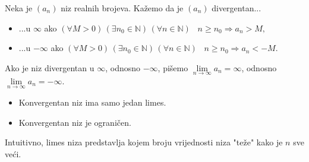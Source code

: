 \begin{definition}
Neka je \((a_n)\) niz realnih brojeva. Kažemo da je \((a_n)\) divergentan...
\begin{itemize}
\item ...u \(\mathbb{\infty}\) ako \((\forall M>0)\,(\exists n_0\in \mathbb{N})\,(\forall n\in \mathbb{N})\;\;\; n\geq n_0\Rightarrow a_n>M,\)

\item ...u \(-\mathbb{\infty}\) ako \((\forall M>0)\,(\exists n_0\in \mathbb{N})\,(\forall n\in \mathbb{N})\;\;\; n\geq n_0\Rightarrow a_n<-M.\)
\end{itemize}
\end{definition}

Ako je niz divergentan u \(\mathbb{\infty}\), odnosno \(-\mathbb{\infty}\), pišemo \(\lim\limits_{n\to \infty}{a_n}=\infty\), odnosno \(\lim\limits_{n\to \infty}{a_n}=-\infty\).
\begin{remark} \textbf{}
\begin{itemize}
\item[a)] Konvergentan niz ima samo jedan limes.
\item[b)] Konvergentan niz je ograničen.
\end{itemize}
\end{remark}

Intuitivno, limes niza predstavlja kojem broju vrijednosti niza "teže" kako je \(n\) sve veći.

